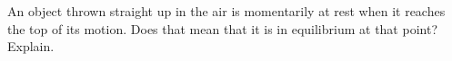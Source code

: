 An object thrown straight up in the air is momentarily at
rest when it reaches the top of its motion. Does that mean
that it is in equilibrium at that point? Explain.

